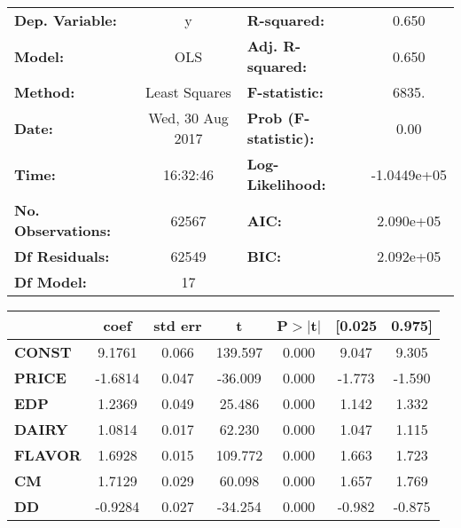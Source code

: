 \documentclass{article}
\begin{document}
\begin{center}
\begin{tabular}{lclc}
\toprule
\textbf{Dep. Variable:}    &        y         & \textbf{  R-squared:         } &      0.650   \\
\textbf{Model:}            &       OLS        & \textbf{  Adj. R-squared:    } &      0.650   \\
\textbf{Method:}           &  Least Squares   & \textbf{  F-statistic:       } &      6835.   \\
\textbf{Date:}             & Wed, 30 Aug 2017 & \textbf{  Prob (F-statistic):} &      0.00    \\
\textbf{Time:}             &     16:32:46     & \textbf{  Log-Likelihood:    } & -1.0449e+05  \\
\textbf{No. Observations:} &       62567      & \textbf{  AIC:               } &  2.090e+05   \\
\textbf{Df Residuals:}     &       62549      & \textbf{  BIC:               } &  2.092e+05   \\
\textbf{Df Model:}         &          17      & \textbf{                     } &              \\
\bottomrule
\end{tabular}
\begin{tabular}{lcccccc}
               & \textbf{coef} & \textbf{std err} & \textbf{t} & \textbf{P$>$$|$t$|$} & \textbf{[0.025} & \textbf{0.975]}  \\
\midrule
\textbf{CONST} &       9.1761  &        0.066     &   139.597  &         0.000        &        9.047    &        9.305     \\
\textbf{PRICE}    &      -1.6814  &        0.047     &   -36.009  &         0.000        &       -1.773    &       -1.590     \\
\textbf{EDP}    &       1.2369  &        0.049     &    25.486  &         0.000        &        1.142    &        1.332     \\
\textbf{DAIRY}    &       1.0814  &        0.017     &    62.230  &         0.000        &        1.047    &        1.115     \\
\textbf{FLAVOR}    &       1.6928  &        0.015     &   109.772  &         0.000        &        1.663    &        1.723     \\
\textbf{CM}    &       1.7129  &        0.029     &    60.098  &         0.000        &        1.657    &        1.769     \\
\textbf{DD}    &      -0.9284  &        0.027     &   -34.254  &         0.000        &       -0.982    &       -0.875     \\

\end{tabular}
\end{center}
\end{document}
